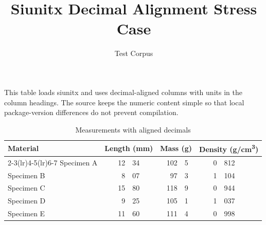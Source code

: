 \documentclass[11pt]{article}
\title{Siunitx Decimal Alignment Stress Case}
\author{Test Corpus}
\date{}
\begin{document}
\maketitle

This table loads siunitx and uses decimal-aligned columns with units in the
column headings. The source keeps the numeric content simple so that local
package-version differences do not prevent compilation.

\begin{table}[htbp]
\centering
\caption{Measurements with aligned decimals}
\label{tab:siunitx}
\begin{tabular}{l r@{.}l r@{.}l r@{.}l}
\toprule
Material
  & \multicolumn{2}{c}{Length (mm)}
  & \multicolumn{2}{c}{Mass (g)}
  & \multicolumn{2}{c}{Density (g/cm\textsuperscript{3})} \\
\cmidrule(lr){2-3}\cmidrule(lr){4-5}\cmidrule(lr){6-7}
\midrule
Specimen A & 12&34 & 102&5 & 0&812 \\
Specimen B &  8&07 &  97&3 & 1&104 \\
Specimen C & 15&80 & 118&9 & 0&944 \\
Specimen D &  9&25 & 105&1 & 1&037 \\
Specimen E & 11&60 & 111&4 & 0&998 \\
\bottomrule
\end{tabular}
\end{table}
\end{document}
